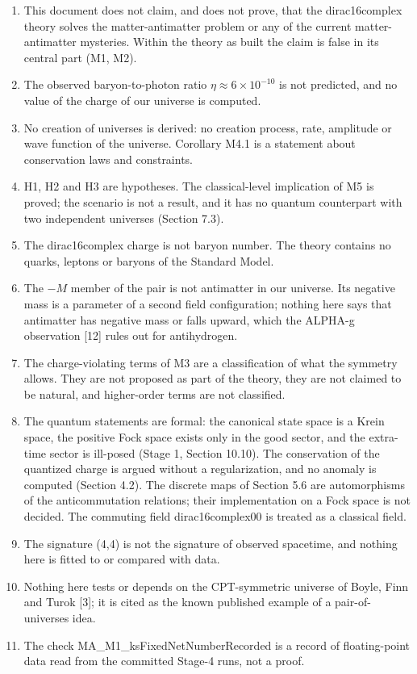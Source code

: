 \documentclass[11pt]{article}
\begin{document}
\begin{enumerate}
\item This document does not claim, and does not prove, that the dirac16complex theory solves the matter-antimatter problem or any of the current matter-antimatter mysteries. Within the theory as built the claim is false in its central part (M1, M2).
\item The observed baryon-to-photon ratio $\eta\approx6\times10^{-10}$ is not predicted, and no value of the charge of our universe is computed.
\item No creation of universes is derived: no creation process, rate, amplitude or wave function of the universe. Corollary M4.1 is a statement about conservation laws and constraints.
\item H1, H2 and H3 are hypotheses. The classical-level implication of M5 is proved; the scenario is not a result, and it has no quantum counterpart with two independent universes (Section 7.3).
\item The dirac16complex charge is not baryon number. The theory contains no quarks, leptons or baryons of the Standard Model.
\item The $-M$ member of the pair is not antimatter in our universe. Its negative mass is a parameter of a second field configuration; nothing here says that antimatter has negative mass or falls upward, which the ALPHA-g observation [12] rules out for antihydrogen.
\item The charge-violating terms of M3 are a classification of what the symmetry allows. They are not proposed as part of the theory, they are not claimed to be natural, and higher-order terms are not classified.
\item The quantum statements are formal: the canonical state space is a Krein space, the positive Fock space exists only in the good sector, and the extra-time sector is ill-posed (Stage 1, Section 10.10). The conservation of the quantized charge is argued without a regularization, and no anomaly is computed (Section 4.2). The discrete maps of Section 5.6 are automorphisms of the anticommutation relations; their implementation on a Fock space is not decided. The commuting field dirac16complex00 is treated as a classical field.
\item The signature (4,4) is not the signature of observed spacetime, and nothing here is fitted to or compared with data.
\item Nothing here tests or depends on the CPT-symmetric universe of Boyle, Finn and Turok [3]; it is cited as the known published example of a pair-of-universes idea.
\item The check MA\_M1\_ksFixedNetNumberRecorded is a record of floating-point data read from the committed Stage-4 runs, not a proof.
\end{enumerate}
\end{document}
